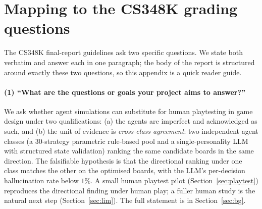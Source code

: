 \documentclass[10pt]{article}
\begin{document}
\section{Mapping to the CS348K grading questions}\label{app:grading}

The CS348K final-report guidelines ask two specific questions. We
state both verbatim and answer each in one paragraph; the body of
the report is structured around exactly these two questions, so
this appendix is a quick reader guide.

\paragraph{(1) ``What are the questions or goals your project aims
to answer?''}
We ask whether agent simulations can substitute for human
playtesting in game design under two qualifications: (a) the agents
are imperfect and acknowledged as such, and (b) the unit of
evidence is \emph{cross-class agreement}: two independent agent
classes (a 30-strategy parametric rule-based pool and a
single-personality LLM with structured state validation) ranking
the same candidate boards in the same direction. The falsifiable
hypothesis is that the directional ranking under one class matches
the other on the optimised boards, with the LLM's per-decision
hallucination rate below $1\%$. A small human playtest pilot
(Section~\ref{sec:playtest}) reproduces the directional finding
under human play; a fuller human study is the natural next step
(Section~\ref{sec:lim}). The full statement is in
Section~\ref{sec:bg}.
\end{document}
